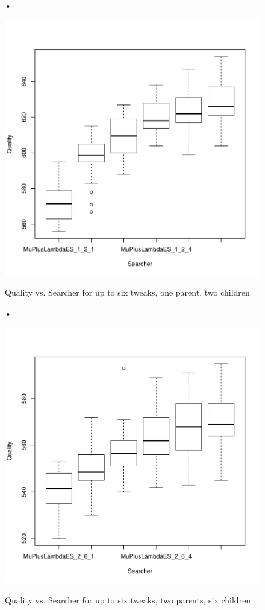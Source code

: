 \documentclass[10pt]{article}
\begin{document}
\begin{figure}[H]
•
\caption{Quality vs. Searcher for up to six tweaks, one parent, two children}
\centering
  \includegraphics[scale=.65]{MuPlusLambdaTweak_1_2}
\label{fig:results}
\end{figure}

\begin{figure}[H]
•

\caption{Quality vs. Searcher for up to six tweaks, two parents, six children}
\centering
  \includegraphics[scale=.65]{MuPlusLambdaTweak_2_6}
\label{fig:results}
\end{figure}
\end{document}
